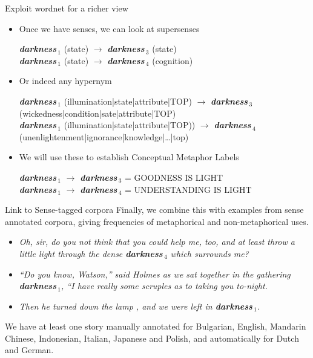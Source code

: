 \documentclass[xetex]{beamer}
\newcommand{\wns}[2]{\textit{\textbf{#1}}\,\ensuremath{_#2}}
\begin{document}
\begin{frame}{Exploit wordnet for a richer view}
  \begin{itemize}
  \item Once we have senses, we can look at supersenses
    \begin{tcolorbox}
      \wns{darkness}{1} (state) $\rightarrow$  \wns{darkness}{3} (state)  \\
      \wns{darkness}{1} (state) $\rightarrow$  \wns{darkness}{4} (cognition) 
    \end{tcolorbox}
   \item Or indeed any hypernym
    \begin{tcolorbox}
      \wns{darkness}{1} (illumination|state|attribute|TOP) $\rightarrow$  \wns{darkness}{3} (wickedness|condition|sate|attribute|TOP)  \\
      \wns{darkness}{1} (illumination|state|attribute|TOP)) $\rightarrow$  \wns{darkness}{4} (unenlightenment|ignorance|knowledge|\ldots{}|top) 
    \end{tcolorbox}
  \item We will use these to establish Conceptual Metaphor Labels
    \begin{tcolorbox}
      \wns{darkness}{1} $\rightarrow$  \wns{darkness}{3}  = GOODNESS IS LIGHT  \\
      \wns{darkness}{1} $\rightarrow$  \wns{darkness}{4}  =  UNDERSTANDING IS LIGHT
    \end{tcolorbox}
  \end{itemize}
\end{frame}

\begin{frame}{Link to Sense-tagged corpora}
 Finally, we combine this with examples from sense annotated corpora, giving frequencies of metaphorical and non-metaphorical uses.

 \begin{tcolorbox}[title=Examples from \textit{The Adventure of the Speckled Band} (English)]
   \begin{itemize}
   \item \textit{Oh, sir, do you not think that you could help me, too, and at least throw a little light through the dense  \wns{darkness}{4} which surrounds me?}
   \item \textit{``Do you know, Watson,'' said Holmes as we sat together in the gathering \wns{darkness}{1}, ``I have really some scruples as to taking you to-night.}
   \item \textit{Then he turned down the lamp , and we were left in \wns{darkness}{1}.} 
   \end{itemize}
 \end{tcolorbox}

We have at least one story manually annotated for  Bulgarian, English, Mandarin Chinese, Indonesian, Italian, Japanese and Polish, and automatically for Dutch and German. 
 
\end{frame}
\end{document}
